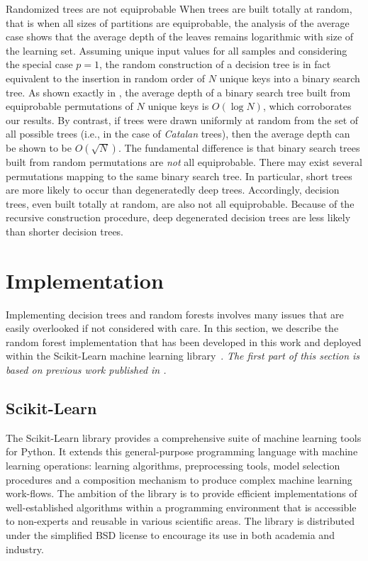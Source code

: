 \begin{remark}{Randomized trees are not equiprobable}
When trees are built totally at random, that is when all sizes of partitions
are equiprobable, the analysis of the average case shows that the average depth
of the leaves remains logarithmic with size of the learning set. Assuming
unique input values for all samples and considering the special case $p=1$,
the random construction of a decision tree
is in fact equivalent to the insertion in random order of $N$ unique keys into
a binary search tree. As shown exactly in \citep{sedgewick:2013}, the average
depth of a binary search tree built from equiprobable permutations of $N$
unique keys is $O(\log N)$, which corroborates our results. By contrast, if
trees were drawn uniformly at random from the set of all possible  trees (i.e.,
in the case of \textit{Catalan} trees), then the average depth can be shown to
be $O(\sqrt{N})$. The fundamental difference is that binary search trees built
from random permutations are \textit{not} all equiprobable. There may exist
several permutations mapping to the same binary search tree. In particular,
short trees are more likely to occur than degeneratedly deep trees. Accordingly,
decision trees, even built totally at random, are also not all equiprobable.
Because of the recursive construction procedure, deep degenerated decision
trees are less likely than shorter decision trees.
\end{remark}


\section{Implementation}
\label{sec:5:impl}

Implementing decision trees and random forests involves many issues that are
easily overlooked if not considered with care. In this section, we describe the
random forest implementation that has been developed in this work and
deployed within the Scikit-Learn machine learning
library~\citep{pedregosa:2011}. \textit{The first part of this section is based
on previous work published in \citep{buitinck:2013}.}

\subsection{Scikit-Learn}

The Scikit-Learn library provides a comprehensive suite of machine learning
tools for Python. It extends this general-purpose programming language with
machine learning operations: learning algorithms, preprocessing tools, model
selection procedures and a composition mechanism to produce complex machine
learning work-flows. The ambition of the library is to provide efficient
implementations of well-established algorithms within a programming environment
that is accessible to non-experts and reusable in various scientific areas. The
library is distributed under the simplified BSD license to encourage its use in
both academia and industry.


